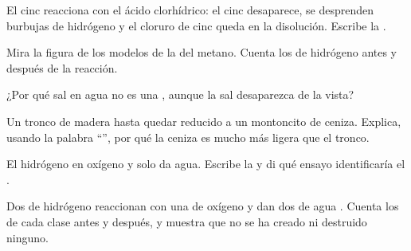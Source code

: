 \begin{exercise}[$\star\star$]\label{exo:g7:chemical-reactions:6}
El cinc reacciona con el ácido clorhídrico: el cinc desaparece, se
desprenden burbujas de hidrógeno y el cloruro de cinc queda en la
disolución. Escribe la .
\end{exercise}

\begin{exercise}[$\star\star$]\label{exo:g7:chemical-reactions:7}
Mira la figura de los modelos de la  del metano. Cuenta los
 de hidrógeno antes y después de la reacción.
\end{exercise}

\begin{exercise}[$\star\star$]\label{exo:g7:chemical-reactions:8}
¿Por qué  sal en agua no es una , aunque la sal
desaparezca de la vista?
\end{exercise}

\begin{exercise}[$\star\star$]\label{exo:g7:chemical-reactions:9}
Un tronco de madera  hasta quedar reducido a un montoncito de
ceniza. Explica, usando la palabra ``'', por qué la ceniza es
mucho más ligera que el tronco.
\end{exercise}

\begin{exercise}[$\star\star$]\label{exo:g7:chemical-reactions:10}
El hidrógeno  en oxígeno y solo da agua. Escribe la  y di qué ensayo identificaría el .
\end{exercise}

\begin{exercise}[$\star\star\star$]\label{exo:g7:chemical-reactions:11}
Dos  de hidrógeno  reaccionan con una  de
oxígeno  y dan dos  de agua . Cuenta los 
de cada clase antes y después, y muestra que no se ha creado ni
destruido ninguno.
\end{exercise}

